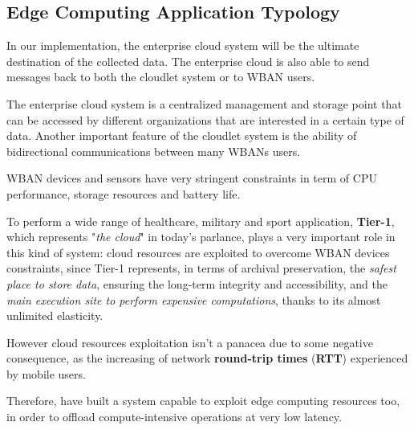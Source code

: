 \documentclass[sigchi]{acmart}
\begin{document}
\subsection{Edge Computing Application Typology}

\vspace{0.3cm}

\begin{quoting}[font=itshape, begintext={``}, endtext={''\cite[par.~3.2]{MSAReport}}]
In our implementation, the enterprise cloud system will be the ultimate destination of the collected data. The enterprise cloud is also able to send messages back to both the cloudlet system or to WBAN users.
\end{quoting}

\vspace{0.3cm}

\begin{quoting}[font=itshape, begintext={``}, endtext={''\cite[par.~4.1]{MSAReport}}]
The enterprise cloud system is a centralized management and storage point that can be accessed by different organizations that are interested in a certain type of data. Another important feature of the cloudlet system is the ability of bidirectional communications between many WBANs users.
\end{quoting}

\vspace{0.3cm}

WBAN devices and sensors have very stringent constraints in term of CPU performance, storage resources and battery life.

To perform a wide range of healthcare, military and sport application, \textbf{Tier-1}, which represents "\textit{the cloud}" in today's parlance, plays a very important role in this kind of system: cloud resources are exploited to overcome WBAN devices constraints, since Tier-1 represents, in terms of archival preservation, the \textit{safest place to store data}, ensuring the long-term integrity and accessibility, and the \textit{main execution site to perform expensive computations}, thanks to its almost unlimited elasticity. 

However cloud resources exploitation isn't a panacea due to some negative consequence, as the increasing of network \textbf{round-trip times} (\textbf{RTT}) experienced by mobile users. 

Therefore, \citet{MSAReport} have built a system capable to exploit edge computing resources too, in order to offload compute-intensive operations at very low latency.\cite{TheSeminalRoleEdgeNativeApplications}\cite{TheEmergenceOfEdgeComputing}
\end{document}

